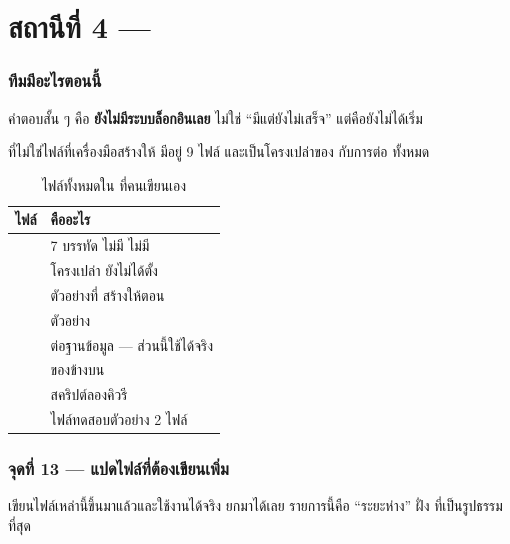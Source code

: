 \clearpage

\part{สถานีที่ 4 --- }

\section{ทีมมีอะไรตอนนี้}

คำตอบสั้น ๆ คือ \textbf{ยังไม่มีระบบล็อกอินเลย} ไม่ใช่ ``มีแต่ยังไม่เสร็จ''
แต่คือยังไม่ได้เริ่ม

 ที่ไม่ใช่ไฟล์ที่เครื่องมือสร้างให้ มีอยู่ 9 ไฟล์
และเป็นโครงเปล่าของ  กับการต่อ  ทั้งหมด

\begin{table}[htbp]
\centering
\footnotesize\sansall
\caption{ไฟล์ทั้งหมดใน  ที่คนเขียนเอง}
\label{tab:beteam}
\begin{tabular}{@{}L{4.4cm}L{8.6cm}@{}}
\toprule
\textbf{ไฟล์} & \textbf{คืออะไร} \\
\midrule
{} & 7 บรรทัด ไม่มี  ไม่มี  \\
 & โครงเปล่า ยังไม่ได้ตั้ง  \\
 &  ตัวอย่างที่  สร้างให้ตอน  \\
 &  ตัวอย่าง \\
 & ต่อฐานข้อมูล --- ส่วนนี้ใช้ได้จริง \\
 &  ของข้างบน \\
 & สคริปต์ลองคิวรี \\
 & ไฟล์ทดสอบตัวอย่าง 2 ไฟล์ \\
\bottomrule
\end{tabular}
\end{table}

\section{จุดที่ 13 --- แปดไฟล์ที่ต้องเขียนเพิ่ม}

 เขียนไฟล์เหล่านี้ขึ้นมาแล้วและใช้งานได้จริง ยกมาได้เลย
รายการนี้คือ ``ระยะห่าง'' ฝั่ง  ที่เป็นรูปธรรมที่สุด

